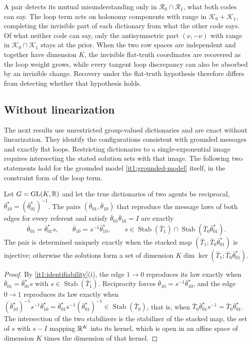 A pair detects its mutual misunderstanding only in $\mathcal R_0\cap\mathcal R_1$, what both codes can say. The loop term acts on holonomy components with range in $\mathcal K_0+\mathcal K_1$, completing the invisible part of each dictionary from what the other code says. Of what neither code can say, only the antisymmetric part $(\nu,-\nu)$ with range in $\mathcal K_0\cap\mathcal K_1$ stays at the prior. When the two row spaces are independent and together have dimension $K$, the invisible flat-truth coordinates are recovered as the loop weight grows, while every tangent loop discrepancy can also be absorbed by an invisible change. Recovery under the flat-truth hypothesis therefore differs from detecting whether that hypothesis holds.

\subsection{Without linearization}

The next results use unrestricted group-valued dictionaries and are exact without linearization. They identify the configurations consistent with grounded messages and exactly flat loops. Restricting dictionaries to a single-exponential image requires intersecting the stated solution sets with that image. The following two statements hold for the grounded model \cref{it1:grounded-model} itself, in the constraint form of the loop term.

Let $G=\mathrm{GL}(K,\mathbb R)$ and let the true dictionaries of two agents be reciprocal, $\bar\theta^\star_{10}=(\bar\theta^\star_{01})^{-1}$. The pairs $(\bar\theta_{01},\bar\theta_{10})$ that reproduce the message laws of both edges for every referent and satisfy $\bar\theta_{01}\bar\theta_{10}=I$ are exactly
\begin{equation}
\bar\theta_{01}=\bar\theta^\star_{01}s,\qquad\bar\theta_{10}=s^{-1}\bar\theta^\star_{10},\qquad
s\in\operatorname{Stab}(\bar T_1)\cap\operatorname{Stab}(\bar T_0\bar\theta^\star_{01}).
\label{it1:exact-pair-eq}
\end{equation}
The pair is determined uniquely exactly when the stacked map $(\bar T_1;\bar T_0\bar\theta^\star_{01})$ is injective; otherwise the solutions form a set of dimension $K\dim\ker(\bar T_1;\bar T_0\bar\theta^\star_{01})$.
\begin{proof}
By \cref{it1:identifiability}(i), the edge $1\to0$ reproduces its law exactly when $\bar\theta_{01}=\bar\theta^\star_{01}s$ with $s\in\operatorname{Stab}(\bar T_1)$. Reciprocity forces $\bar\theta_{10}=s^{-1}\bar\theta^\star_{10}$, and the edge $0\to1$ reproduces its law exactly when $(\bar\theta^\star_{10})^{-1}s^{-1}\bar\theta^\star_{10}=\bar\theta^\star_{01}s^{-1}(\bar\theta^\star_{01})^{-1}\in\operatorname{Stab}(\bar T_0)$, that is, when $\bar T_0\bar\theta^\star_{01}s^{-1}=\bar T_0\bar\theta^\star_{01}$. The intersection of the two stabilizers is the stabilizer of the stacked map, the set of $s$ with $s-I$ mapping $\mathbb R^K$ into its kernel, which is open in an affine space of dimension $K$ times the dimension of that kernel.
\end{proof}

